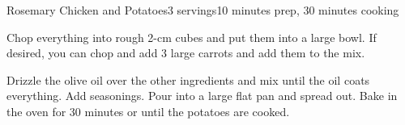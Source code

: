 \documentclass[../Cookbook.tex]{subfiles}
\begin{document}
\begin{recipe}{Rosemary Chicken and Potatoes}{3 servings}{10 minutes prep, 30 minutes cooking}


Chop everything into rough 2-cm cubes and put them into a large bowl. 
If desired, you can chop and add 3 large carrots and add them to the mix.

Drizzle the olive oil over the other ingredients and mix until the oil coats everything. 
Add seasonings. 
Pour into a large flat pan and spread out. 
Bake in the oven for 30 minutes or until the potatoes are cooked.


\end{recipe}
\end{document}
